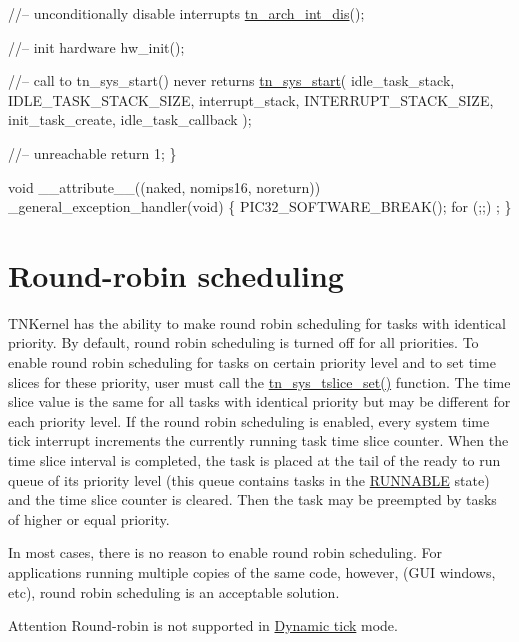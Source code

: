 \begin{DoxyCodeInclude}
   \textcolor{comment}{//-- unconditionally disable interrupts}
   \hyperlink{tn__arch_8h_a2b3f2294ac42a599662c573394b14c75}{tn\_arch\_int\_dis}();

   \textcolor{comment}{//-- init hardware}
   hw\_init();

   \textcolor{comment}{//-- call to tn\_sys\_start() never returns}
   \hyperlink{tn__sys_8h_a62ab25d9d8ca01c02d368968f19e49bf}{tn\_sys\_start}(
         idle\_task\_stack,
         IDLE\_TASK\_STACK\_SIZE,
         interrupt\_stack,
         INTERRUPT\_STACK\_SIZE,
         init\_task\_create,
         idle\_task\_callback
         );

   \textcolor{comment}{//-- unreachable}
   \textcolor{keywordflow}{return} 1;
\}

\textcolor{keywordtype}{void} \_\_attribute\_\_((naked, nomips16, noreturn)) \_general\_exception\_handler(\textcolor{keywordtype}{void})
\{
   PIC32\_SOFTWARE\_BREAK();
   \textcolor{keywordflow}{for} (;;) ;
\}

\end{DoxyCodeInclude}
\hypertarget{quick_guide_round_robin}{}\section{Round-\/robin scheduling}\label{quick_guide_round_robin}
T\+N\+Kernel has the ability to make round robin scheduling for tasks with identical priority. By default, round robin scheduling is turned off for all priorities. To enable round robin scheduling for tasks on certain priority level and to set time slices for these priority, user must call the {\ttfamily \hyperlink{tn__sys_8h_a05fc370b6faa604fd8ff9411361c4cd0}{tn\+\_\+sys\+\_\+tslice\+\_\+set()}} function. The time slice value is the same for all tasks with identical priority but may be different for each priority level. If the round robin scheduling is enabled, every system time tick interrupt increments the currently running task time slice counter. When the time slice interval is completed, the task is placed at the tail of the ready to run queue of its priority level (this queue contains tasks in the \hyperlink{tn__tasks_8h_a5e12e8a0ab280b515f44bf3fee1210a6a02783ac7808aeda318a6f506b7a276dc}{{\ttfamily R\+U\+N\+N\+A\+B\+LE}} state) and the time slice counter is cleared. Then the task may be preempted by tasks of higher or equal priority.

In most cases, there is no reason to enable round robin scheduling. For applications running multiple copies of the same code, however, (G\+UI windows, etc), round robin scheduling is an acceptable solution.

\begin{DoxyAttention}{Attention}
Round-\/robin is not supported in \hyperlink{time_ticks_time_ticks__dynamic_tick}{Dynamic tick} mode. 
\end{DoxyAttention}

